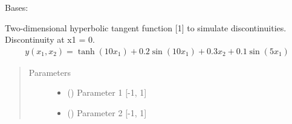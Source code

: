 \documentclass[letterpaper,10pt,english,openany,oneside]{sphinxmanual}
\begin{document}

\begin{fulllineitems}
\label{\detokenize{pygpc.testfunctions:pygpc.testfunctions.testfunctions.HyperbolicTangent}}
Bases: {\hyperref[\detokenize{pygpc:pygpc.AbstractModel.AbstractModel}]{}}

Two-dimensional hyperbolic tangent function {[}1{]} to simulate discontinuities. Discontinuity at x1 = 0.
\begin{equation*}
\begin{split}y(x_1, x_2) = \tanh(10 x_1) + 0.2 \sin(10 x_1) + 0.3 x_2 + 0.1 \sin(5 x_1)\end{split}
\end{equation*}\begin{quote}\begin{description}
\item[{Parameters}] \leavevmode\begin{itemize}
\item {} 
\sphinxstyleliteralstrong{\sphinxupquote{{[}}}\sphinxstyleliteralstrong{\sphinxupquote{{]}}} (\sphinxstyleliteralemphasis{\sphinxupquote{ {[}}}\sphinxstyleliteralemphasis{\sphinxupquote{{]}}}) \textendash{} Parameter 1 {[}-1, 1{]}

\item {} 
\sphinxstyleliteralstrong{\sphinxupquote{{[}}}\sphinxstyleliteralstrong{\sphinxupquote{{]}}} (\sphinxstyleliteralemphasis{\sphinxupquote{ {[}}}\sphinxstyleliteralemphasis{\sphinxupquote{{]}}}) \textendash{} Parameter 2 {[}-1, 1{]}

\end{itemize}


\end{description}
\end{quote}
\end{fulllineitems}
\end{document}
